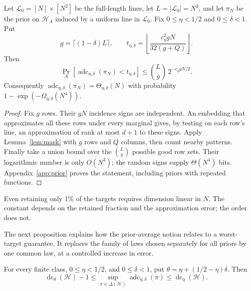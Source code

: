 \documentclass[11pt,letterpaper,pmlr,twoside]{jmlr}
\newcommand{\Hc}{\mathcal H}
\newcommand{\Lc}{\mathcal L}
\newcommand{\dc}{\operatorname{dc}}
\newcommand{\ceil}[1]{\lceil #1\rceil}
\newcommand{\adc}{\operatorname{adc}}
\newenvironment{proofsketch}{%
  \renewcommand{\proofname}{Proof sketch}%
  \begin{proof}%
}{\end{proof}}
\begin{document}
\begin{theorem}\label{thm:prior}
Let $\Lc_0=[N]\times[N^2]$ be the full-length lines, let $L=|\Lc_0|=N^3$, and let $\pi_N$ be the prior on $\Hc_A$ induced by a uniform line in $\Lc_0$. Fix $0\le\eta<1/2$ and $0\le\delta<1$. Put
\begin{equation}
 g=\ceil{(1-\delta)L},\qquad
 t_{\eta,\delta}=\left\lfloor\frac{c_\eta^2 gN}{32(g+Q)}\right\rfloor.
 \label{eq:prior-threshold}
\end{equation}
Then
\begin{equation}
 \Pr_A[\adc_{\eta,\delta}(\pi_N)<t_{\eta,\delta}]
 \le \binom{L}{g}\,2^{-c_\eta gN/2}.
 \label{eq:prior-prob}
\end{equation}
Consequently $\adc_{\eta,\delta}(\pi_N)=\Theta_{\eta,\delta}(N)$ with probability $1-\exp(-\Omega_{\eta,\delta}(N^4))$.
\end{theorem}

\begin{proofsketch}
Fix $g$ rows. Their $gN$ incidence signs are independent. An embedding that approximates all these rows under every marginal gives, by testing on each row's line, an approximation of rank at most $d+1$ to these signs. Apply Lemma~\ref{lem:mask} with $g$ rows and $Q$ columns, then count nearby patterns. Finally take a union bound over the $\binom{L}{g}$ possible good row sets. Their logarithmic number is only $O(N^3)$; the random signs supply $\Theta(N^4)$ bits. Appendix~\ref{app:prior} proves the statement, including priors with repeated functions.
\end{proofsketch}

Even retaining only $1\%$ of the targets requires dimension linear in $N$. The constant depends on the retained fraction and the approximation error; the order does not.

The next proposition explains how the prior-average notion relates to a worst-target guarantee. It replaces the family of laws chosen separately for all priors by one common law, at a controlled increase in error.

\begin{proposition}\label{prop:prior-minimax}
For every finite class, $0\le\eta<1/2$, and $0\le\delta<1$, put $\theta=\eta+(1/2-\eta)\delta$. Then
\begin{equation}
 \dc_\theta(\Hc)-1
 \le \sup_{\pi\in\Delta(\Hc)}\adc_{\eta,\delta}(\pi)
 \le \dc_\eta(\Hc).
 \label{eq:prior-minimax}
\end{equation}
\end{proposition}
\end{document}
